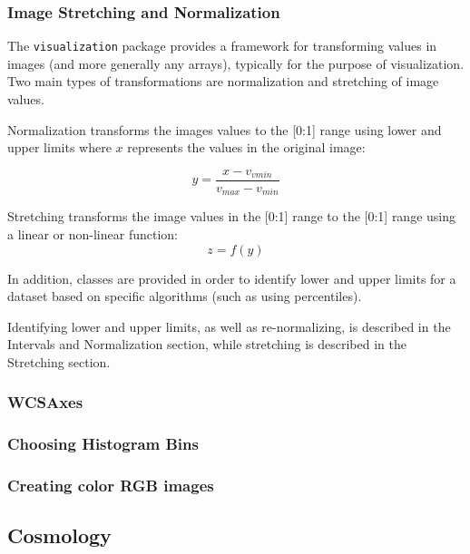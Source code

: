 \documentclass[modern]{aastex61}
\newcommand{\package}[1]{\texttt{#1}\xspace}
\begin{document}
\subsubsection{Image Stretching and Normalization}

The \package{visualization} package provides a framework for transforming values in images (and more generally any arrays), typically for the purpose of visualization. Two main types of transformations are normalization and stretching of image values.

Normalization transforms the images values to the [0:1] range using lower and upper limits where $x$ represents the values in the original image:

\begin{equation}
y = \frac{x - v_{vmin}}{v_{max} - v_{min}}
\end{equation}

Stretching transforms the image values in the [0:1] range to the [0:1] range using a linear or non-linear function:
\begin{equation}
z = f(y)
\end{equation}

In addition, classes are provided in order to identify lower and upper limits for a dataset based on specific algorithms (such as using percentiles).

Identifying lower and upper limits, as well as re-normalizing, is described in the Intervals and Normalization section, while stretching is described in the Stretching section.

\subsubsection{WCSAxes}

\subsubsection{Choosing Histogram Bins}

\subsubsection{Creating color RGB images}


\subsection{Cosmology}
\end{document}
